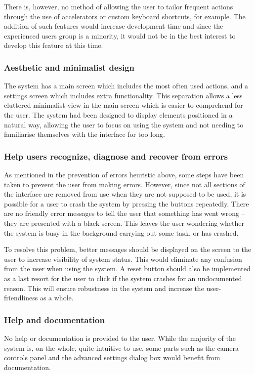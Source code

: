 There is, however, no method of allowing the user to tailor frequent actions through the use of accelerators or custom keyboard shortcuts, for example. The addition of such features would increase development time and since the experienced users group is a minority, it would not be in the best interest to develop this feature at this time.

\subsubsection{Aesthetic and minimalist design}
The system has a main screen which includes the most often used actions, and a settings screen which includes extra functionality. This separation allows a less cluttered minimalist view in the main screen which is easier to comprehend for the user. The system had been designed to display elements positioned in a natural way, allowing the user to focus on using the system and not needing to familiarise themselves with the interface for too long.   

\subsubsection{Help users recognize, diagnose and recover from errors}
As mentioned in the prevention of errors heuristic above, some steps have been taken to prevent the user from making errors. However, since not all sections of the interface are removed from use when they are not supposed to be used, it is possible for a user to crash the system by pressing the buttons repeatedly. There are no friendly error messages to tell the user that something has went wrong -- they are presented with a black screen. This leaves the user wondering whether the system is busy in the background carrying out some task, or has crashed.

To resolve this problem, better messages should be displayed on the screen to the user to increase visibility of system status. This would eliminate any confusion from the user when using the system. A reset button should also be implemented as a last resort for the user to click if the system crashes for an undocumented reason. This will ensure robustness in the system and increase the user-friendliness as a whole.

\subsubsection{Help and documentation}
No help or documentation is provided to the user. While the majority of the system is, on the whole, quite intuitive to use, some parts such as the camera controls panel and the advanced settings dialog box would benefit from documentation.

